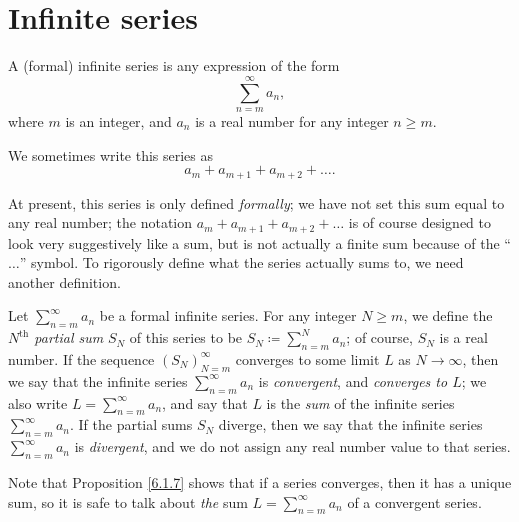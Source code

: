 \section{Infinite series}\label{sec 7.2}

\begin{definition}\label{7.2.1}
    A (formal) infinite series is any expression of the form
    \[
        \sum_{n = m}^\infty a_n,
    \]
    where \(m\) is an integer, and \(a_n\) is a real number for any integer \(n \geq m\).
\end{definition}

\begin{note}
    We sometimes write this series as
    \[
        a_m + a_{m + 1} + a_{m + 2} + \dots.
    \]
\end{note}

\begin{note}
    At present, this series is only defined \emph{formally};
    we have not set this sum equal to any real number;
    the notation \(a_m + a_{m + 1} + a_{m + 2} + \dots\) is of course designed to look very suggestively like a sum, but is not actually a finite sum because of the ``\(\dots\)'' symbol.
    To rigorously define what the series actually sums to, we need another definition.
\end{note}

\begin{definition}\label{7.2.2}
    Let \(\sum_{n = m}^\infty a_n\) be a formal infinite series.
    For any integer \(N \geq m\), we define the \emph{\(N^{\text{th}}\) partial sum} \(S_N\) of this series to be \(S_N \coloneqq \sum_{n = m}^N a_n\);
    of course, \(S_N\) is a real number.
    If the sequence \((S_N)_{N = m}^\infty\) converges to some limit \(L\) as \(N \to \infty\), then we say that the infinite series \(\sum_{n = m}^\infty a_n\) is \emph{convergent}, and \emph{converges to \(L\)};
    we also write \(L = \sum_{n = m}^\infty a_n\), and say that \(L\) is the \emph{sum} of the infinite series \(\sum_{n = m}^\infty a_n\).
    If the partial sums \(S_N\) diverge, then we say that the infinite series \(\sum_{n = m}^\infty a_n\) is \emph{divergent}, and we do not assign any real number value to that series.
\end{definition}

\begin{remark}\label{7.2.3}
    Note that Proposition \ref{6.1.7} shows that if a series converges, then it has a unique sum, so it is safe to talk about \emph{the} sum \(L = \sum_{n = m}^\infty a_n\) of a convergent series.
\end{remark}

